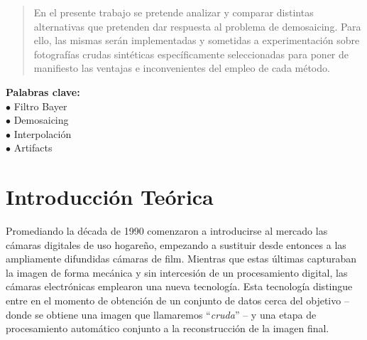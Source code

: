 \documentclass[a4paper]{article}
\begin{document}
\thispagestyle{empty}

\maketitle
\newpage

\thispagestyle{empty}
\vfill
\begin{abstract}
En el presente trabajo se pretende analizar y comparar distintas alternativas que pretenden dar respuesta al problema de demosaicing. Para ello, las mismas serán implementadas y sometidas a experimentación sobre fotografías crudas sintéticas específicamente seleccionadas para poner de manifiesto las ventajas e inconvenientes del empleo de cada método. \\
\end{abstract}

\textbf{Palabras clave:} \\
$\bullet$ Filtro Bayer \\
$\bullet$ Demosaicing \\
$\bullet$ Interpolaci\'on \\
$\bullet$ Artifacts \\



\thispagestyle{empty}
\vspace{3cm}
\tableofcontents
\newpage


\newpage

\section{Introducci\'on Te\'orica}

Promediando la década de 1990 comenzaron a introducirse al mercado las cámaras digitales de uso hogareño, empezando a sustituir desde entonces a las ampliamente difundidas cámaras de film. 
Mientras que estas últimas capturaban la imagen de forma mecánica y sin intercesión de un procesamiento digital, las cámaras electrónicas emplearon una nueva tecnología. Esta tecnolog\'ia distingue entre en el momento de obtención de un conjunto de datos cerca del objetivo – donde se obtiene una imagen que llamaremos “\textit{cruda}” – y una etapa de procesamiento automático conjunto a la reconstrucción de la imagen final. \\
\end{document}
